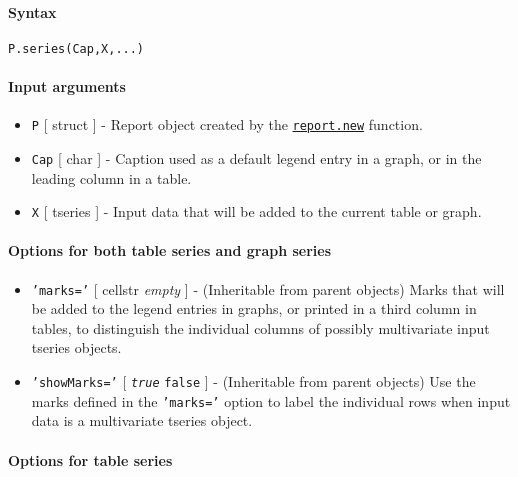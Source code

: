 


	\paragraph{Syntax}\label{syntax}

\begin{verbatim}
P.series(Cap,X,...)
\end{verbatim}

\paragraph{Input arguments}\label{input-arguments}

\begin{itemize}
\item
  \texttt{P} {[} struct {]} - Report object created by the
  \href{report/new}{\texttt{report.new}} function.
\item
  \texttt{Cap} {[} char {]} - Caption used as a default legend entry in
  a graph, or in the leading column in a table.
\item
  \texttt{X} {[} tseries {]} - Input data that will be added to the
  current table or graph.
\end{itemize}

\paragraph{Options for both table series and graph
series}\label{options-for-both-table-series-and-graph-series}

\begin{itemize}
\item
  \texttt{'marks='} {[} cellstr \textbar{} \emph{empty} {]} -
  (Inheritable from parent objects) Marks that will be added to the
  legend entries in graphs, or printed in a third column in tables, to
  distinguish the individual columns of possibly multivariate input
  tseries objects.
\item
  \texttt{'showMarks='} {[} \emph{\texttt{true}} \textbar{}
  \texttt{false} {]} - (Inheritable from parent objects) Use the marks
  defined in the \texttt{'marks='} option to label the individual rows
  when input data is a multivariate tseries object.
\end{itemize}

\paragraph{Options for table series}\label{options-for-table-series}

